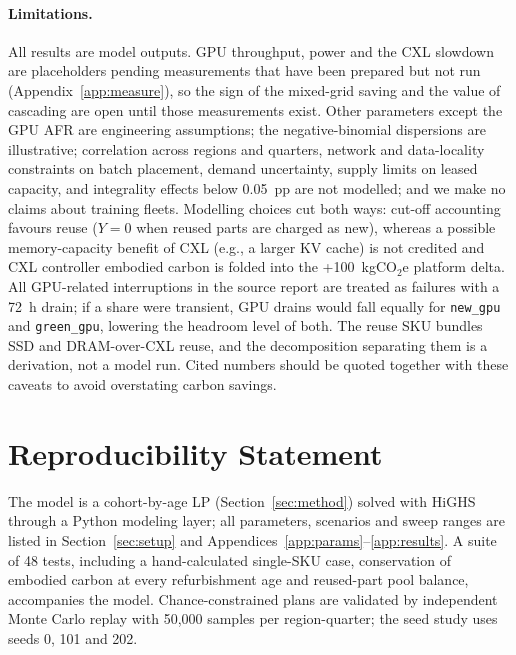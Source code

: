 \documentclass{article} %
\begin{document}
\paragraph{Limitations.} All results are model outputs. GPU throughput, power and the CXL slowdown are placeholders pending measurements that have been prepared but not run (Appendix~\ref{app:measure}), so the sign of the mixed-grid saving and the value of cascading are open until those measurements exist. Other parameters except the GPU AFR are engineering assumptions; the negative-binomial dispersions are illustrative; correlation across regions and quarters, network and data-locality constraints on batch placement, demand uncertainty, supply limits on leased capacity, and integrality effects below 0.05~pp are not modelled; and we make no claims about training fleets. Modelling choices cut both ways: cut-off accounting favours reuse ($Y=0$ when reused parts are charged as new), whereas a possible memory-capacity benefit of CXL (e.g., a larger KV cache) is not credited and CXL controller embodied carbon is folded into the +100~kgCO$_2$e platform delta. All GPU-related interruptions in the source report are treated as failures with a 72~h drain; if a share were transient, GPU drains would fall equally for \texttt{new\_gpu} and \texttt{green\_gpu}, lowering the headroom level of both. The reuse SKU bundles SSD and DRAM-over-CXL reuse, and the decomposition separating them is a derivation, not a model run. Cited numbers should be quoted together with these caveats to avoid overstating carbon savings.

\section*{Reproducibility Statement}
The model is a cohort-by-age LP (Section~\ref{sec:method}) solved with HiGHS through a Python modeling layer; all parameters, scenarios and sweep ranges are listed in Section~\ref{sec:setup} and Appendices~\ref{app:params}--\ref{app:results}. A suite of 48 tests, including a hand-calculated single-SKU case, conservation of embodied carbon at every refurbishment age and reused-part pool balance, accompanies the model. Chance-constrained plans are validated by independent Monte Carlo replay with 50,000 samples per region-quarter; the seed study uses seeds 0, 101 and 202.



\end{document}
